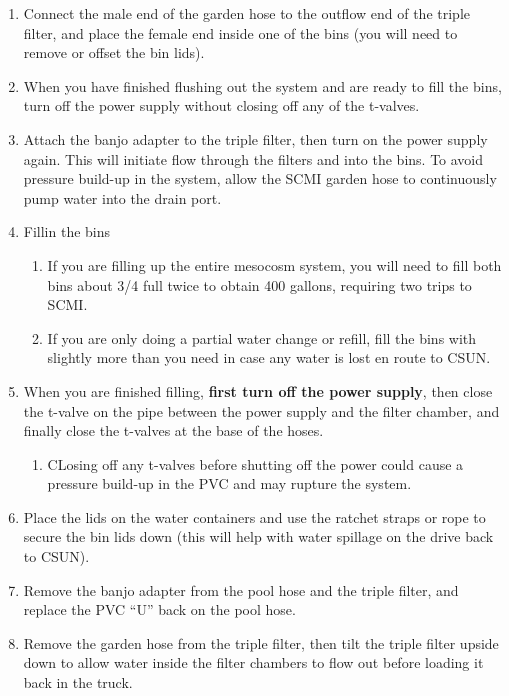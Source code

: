 \documentclass[]{book}
\providecommand{\tightlist}{%
  \setlength{\itemsep}{0pt}\setlength{\parskip}{0pt}}
\begin{document}
\begin{enumerate}
\def\labelenumi{\arabic{enumi}.}
\tightlist
\item
  Connect the male end of the garden hose to the outflow end of the
  triple filter, and place the female end inside one of the bins (you
  will need to remove or offset the bin lids).
\item
  When you have finished flushing out the system and are ready to fill
  the bins, turn off the power supply without closing off any of the
  t-valves.
\item
  Attach the banjo adapter to the triple filter, then turn on the power
  supply again. This will initiate flow through the filters and into the
  bins. To avoid pressure build-up in the system, allow the SCMI garden
  hose to continuously pump water into the drain port.
\item
  Fillin the bins

  \begin{enumerate}
  \def\labelenumii{\arabic{enumii}.}
  \tightlist
  \item
    If you are filling up the entire mesocosm system, you will need to
    fill both bins about 3/4 full twice to obtain 400 gallons, requiring
    two trips to SCMI.
  \item
    If you are only doing a partial water change or refill, fill the
    bins with slightly more than you need in case any water is lost en
    route to CSUN.
  \end{enumerate}
\item
  When you are finished filling, \textbf{first turn off the power
  supply}, then close the t-valve on the pipe between the power supply
  and the filter chamber, and finally close the t-valves at the base of
  the hoses.

  \begin{enumerate}
  \def\labelenumii{\arabic{enumii}.}
  \tightlist
  \item
    CLosing off any t-valves before shutting off the power could cause a
    pressure build-up in the PVC and may rupture the system.
  \end{enumerate}
\item
  Place the lids on the water containers and use the ratchet straps or
  rope to secure the bin lids down (this will help with water spillage
  on the drive back to CSUN).
\item
  Remove the banjo adapter from the pool hose and the triple filter, and
  replace the PVC ``U'' back on the pool hose.
\item
  Remove the garden hose from the triple filter, then tilt the triple
  filter upside down to allow water inside the filter chambers to flow
  out before loading it back in the truck.
\end{enumerate}
\end{document}
